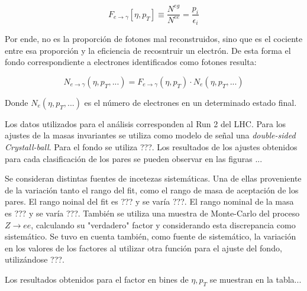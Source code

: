 \begin{equation}
F_{e\rightarrow\gamma}[\eta , p_{T}]\equiv\frac{N^{eg}}{N^{ee}}=\frac{p_{i}}{\epsilon_{i}}
\end{equation}

Por ende, no es la proporción de fotones mal reconstruidos, sino que es el cociente entre esa proporción y la eficiencia de recosntruir un electrón. De esta forma el fondo correspondiente a electrones identificados como fotones resulta:

\begin{equation}
N_{e\rightarrow\gamma}(\eta , p_{T} , ... )=F_{e\rightarrow\gamma}(\eta , p_{T})\cdot N_{e}(\eta , p_{T} , ...)
\end{equation}
	
Donde $N_{e}(\eta , p_{T} , ...)$ es el número de electrones en un determinado estado final.

Los datos utilizados para el análisis corresponden al Run 2 del LHC. Para los ajustes de la masas invariantes se utiliza como modelo de señal una \textit{double-sided Crystall-ball}. Para el fondo se utiliza ???. Los resultados de los ajustes obtenidos para cada clasificación de los pares se pueden observar en las figuras ...

Se consideran distintas fuentes de incetezas sistemáticas. Una de ellas proveniente de la variación tanto el rango del fit, como el rango de masa de aceptación de los pares. El rango noinal del fit es ??? y se varía ???. El rango nominal de la masa es ??? y se varía ???. También se utiliza una muestra de Monte-Carlo del proceso $Z\rightarrow ee$, calculando su "verdadero" factor y considerando esta discrepancia como sistemático. Se tuvo en cuenta también, como fuente de sistemático, la variación en los valores de los factores al utilizar otra función para el ajuste del fondo, utilizándose ???.

Los resultados obtenidos para el factor en bines de $\eta , p_{T}$ se muestran en la tabla...